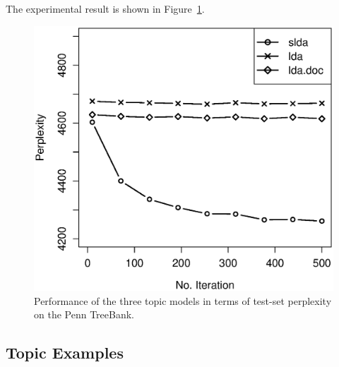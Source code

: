 The experimental result is shown in Figure~\ref{f:perplexity}.

\begin{figure}[!ht]
  \includegraphics[width=\columnwidth]{ppl.eps}
  \caption{Performance of the three topic models in terms of test-set perplexity on the Penn TreeBank.}
  \label{f:perplexity}
\end{figure}

\subsection{Topic Examples} \label{ss:topic-examples}


